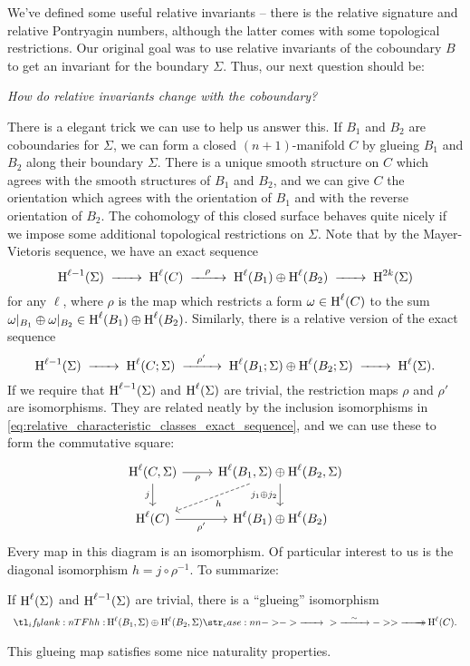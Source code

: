 We've defined some useful relative invariants -- there is the relative signature and relative Pontryagin numbers, although the latter comes with some topological restrictions. Our original goal was to use relative invariants of the coboundary $B$ to get an invariant for the boundary $\Sigma$. Thus, our next question should be:
\begin{center}
	\textsl{How do relative invariants change with the coboundary?}
\end{center}

There is a elegant trick we can use to help us answer this. If $B_1$ and $B_2$ are coboundaries for $\Sigma$, we can form a closed $(n+1)$-manifold $C$ by glueing $B_1$ and $B_2$ along their boundary $\Sigma$. There is a unique smooth structure on $C$ which agrees with the smooth structures of $B_1$ and $B_2$, and we can give $C$ the orientation which agrees with the orientation of $B_1$ and with the reverse orientation of $B_2$. The cohomology of this closed surface behaves quite nicely if we impose some additional topological restrictions on $\Sigma$. Note that by the Mayer-Vietoris sequence, we have an exact sequence
\[
	\H^{\ell-1}(\Sigma)\lkxto \H^{\ell}(C) \lkxto[\rho] \H^{\ell}(B_1)\oplus \H^{\ell}(B_2) \lkxto \H^{2k}(\Sigma)
\]
for any $\ell$, where $\rho$ is the map which restricts a form $\omega\in \operatorname{H}^\ell(C)$ to the sum $\omega|_{B_1}\oplus \omega|_{B_2}\in \operatorname{H}^{\ell}(B_1)\oplus \operatorname{H}^{\ell}(B_2)$. Similarly, there is a relative version of the exact sequence
\[
	\H^{\ell-1}(\Sigma)\lkxto \H^{\ell}(C; \Sigma) \lkxto[\rho'] \H^{\ell}(B_1;\Sigma)\oplus \H^{\ell}(B_2;\Sigma) \lkxto \H^{\ell}(\Sigma).
\]
If we require that $\operatorname{H}^{\ell-1}(\Sigma)$ and $\operatorname{H}^{\ell}(\Sigma)$ are trivial, the restriction maps $\rho$ and $\rho'$ are isomorphisms. They are related neatly by the inclusion isomorphisms in \cref{eq:relative_characteristic_classes_exact_sequence}, and we can use these to form the commutative square:
\begin{equation}\label{eq:closing_coboundaries_square}
	\begin{tikzcd}
		{\H^{\ell}(C,\Sigma)} & {\H^{\ell}(B_1,\Sigma)\oplus\H^{\ell}(B_2,\Sigma)} \\
		{\H^{\ell}(C)} & {\H^{\ell}(B_1)\oplus\H^{\ell}(B_2)}
		\arrow["j_1\oplus j_2"', from=1-2, to=2-2]
		\arrow["\rho"', from=1-1, to=1-2]
		\arrow["j"', from=1-1, to=2-1]
		\arrow["\rho'"', from=2-1, to=2-2]
		\arrow["h", from=1-2, to=2-1, dashed]
	\end{tikzcd}
\end{equation}
Every map in this diagram is an isomorphism. Of particular interest to us is the diagonal isomorphism $h = j\circ \rho^{-1}$. To summarize:
\begin{proposition}
	If $\operatorname{H}^{\ell}(\Sigma)$ and $\operatorname{H}^{\ell-1}(\Sigma)$ are trivial, there is a ``glueing'' isomorphism
	\[
		\lkxfunc{h}{\H^\ell(B_1, \Sigma)\oplus \H^{\ell}(B_2,\Sigma)}{\H^\ell(C).}
	\]
\end{proposition}
This glueing map satisfies some nice naturality properties.

